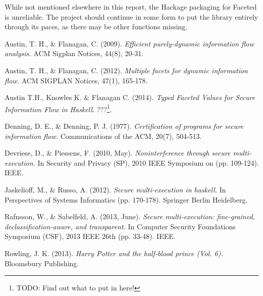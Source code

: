 \documentclass[12pt,a4paper]{article}
\begin{document}
	  While not mentioned elsewhere in this report, the Hackage packaging for Faceted is unreliable. The project should continue in some form to put the library entirely through its paces, as there may be other functions missing.
 	
	\begin{thebibliography}{9}
		
		Austin, T. H., \& Flanagan, C. (2009). 
		\textit{Efficient purely-dynamic information flow analysis. }
		ACM Sigplan Notices, 44(8), 20-31.
		
		Austin, T. H., \& Flanagan, C. (2012). 
		\textit{Multiple facets for dynamic information flow. }
		ACM SIGPLAN Notices, 47(1), 165-178.
		
		Austin T.H., Knowles K. \& Flanagan C. (2014).
		\textit{Typed Faceted Values for Secure Information Flow in Haskell.}
		???\footnote{TODO: Find out what to put in here!}.
		
		Denning, D. E., \& Denning, P. J. (1977). 
		\textit{Certification of programs for secure information flow. }
		Communications of the ACM, 20(7), 504-513.
		
		Devriese, D., \& Piessens, F. (2010, May). 
		\textit{Noninterference through secure multi-execution. }
		In Security and Privacy (SP), 2010 IEEE Symposium on (pp. 109-124). IEEE.
		
		Jaskelioff, M., \& Russo, A. (2012). 
		\textit{Secure multi-execution in haskell. }
		In Perspectives of Systems Informatics (pp. 170-178). Springer Berlin Heidelberg.
		
		Rafnsson, W., \& Sabelfeld, A. (2013, June). 
		\textit{Secure multi-execution: fine-grained, declassification-aware, and transparent. }
		In Computer Security Foundations Symposium (CSF), 2013 IEEE 26th (pp. 33-48). IEEE.
		
		Rowling, J. K. (2013). 
		\textit{Harry Potter and the half-blood prince (Vol. 6). }
		Bloomsbury Publishing.
		
	\end{thebibliography}
	
\end{document}
